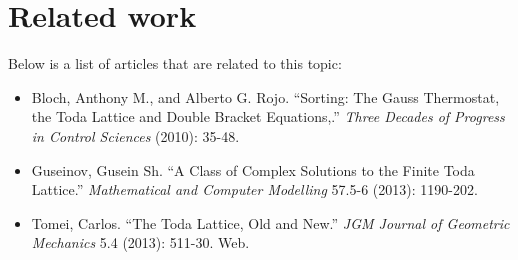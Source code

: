 \documentclass{article}
\begin{document}
\section{Related work}

Below is a list of articles that are related to this topic: 
\begin{itemize}

\item{
    Bloch, Anthony M., and Alberto G. Rojo. ``Sorting: The Gauss Thermostat, the Toda Lattice and Double Bracket Equations,.'' \textit{Three Decades of Progress in Control Sciences} (2010): 35-48. }
\item{
    Guseinov, Gusein Sh. ``A Class of Complex Solutions to the Finite Toda Lattice.'' \textit{Mathematical and Computer Modelling} 57.5-6 (2013): 1190-202.}
    
\item{
    Tomei, Carlos. ``The Toda Lattice, Old and New.'' \textit{JGM Journal of Geometric Mechanics} 5.4 (2013): 511-30. Web.}
\end{itemize}
\end{document}
